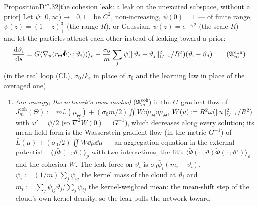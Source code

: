 \begin{thm}{Proposition}{D$'''$.32}[the cohesion leak: a leak on the unexcited subspace, without a
prior]\label{res:thmDppp:32}%
Let $\psi : [0,\infty)\to[0,1]$ be $C^2$, non-increasing, $\psi(0) = 1$ --- of finite range, $\psi(z) = (1 - z)^3_+$
(the range $R$), or Gaussian, $\psi(z) = e^{-z/2}$ (the scale $R$) --- and let the particles attract each other
instead of leaking toward a prior:
\begin{equation}
  \frac{\dd\vartheta_i}{\dd s} = G\langle\nabla_\vartheta(r_\Theta\tilde\Phi(\cdot\,;\vartheta_i))\rangle_\rho
  - \frac{\sigma_0}m\sum_j\psi(\norm{\vartheta_i - \vartheta_j}^2_{G^{-1}}/R^2)(\vartheta_i - \vartheta_j)
  \tag{$\mathfrak{A}_m^{\mathrm{coh}}$}
\end{equation}
(in the real loop \textup{(CL)}, $\sigma_0/k_e$ in place of $\sigma_0$ and the learning law in place of the averaged
one).
\begin{enumerate}[label=\textup{(\roman*)}]
  \item \emph{(an energy; the network's own modes)} \textup{($\mathfrak{A}_m^{\mathrm{coh}}$)} is the $G$-gradient
    flow of $J^{\mathrm{coh}}_m(\Theta) := m\bar L(\mu_\Theta) + (\sigma_0m/2)\iint W\dd\mu_\Theta\dd\mu_\Theta$,
    $W(u) := R^2\omega(\lVert u\rVert^2_{G^{-1}}/R^2)$ with $\omega' = \psi/2$ (so $\nabla^2W(0) = G^{-1}$), which
    decreases along every solution; its mean-field form is the Wasserstein gradient flow (in the metric $G^{-1}$) of
    $\bar L(\mu) + (\sigma_0/2)\iint W\dd\mu\dd\mu$ --- an aggregation equation in the external potential
    $-\langle f\tilde\Phi(\cdot\,;\vartheta)\rangle_\rho$ with two interactions, the fit's
    $\langle\tilde\Phi(\cdot\,;\vartheta)\tilde\Phi(\cdot\,;\vartheta')\rangle_\rho$ and the cohesion $W$. The leak
    force on $\vartheta_i$ is $\sigma_0\bar\psi_i(m_i - \vartheta_i)$, $\bar\psi_i := (1/m)\sum_j\psi_{ij}$ the
    kernel mass of the cloud at $\vartheta_i$ and $m_i := \sum_j\psi_{ij}\vartheta_j/\sum_j\psi_{ij}$ the
    kernel-weighted mean: the mean-shift step of the cloud's own kernel density, so the leak pulls the network toward

\end{enumerate}
\end{thm}
